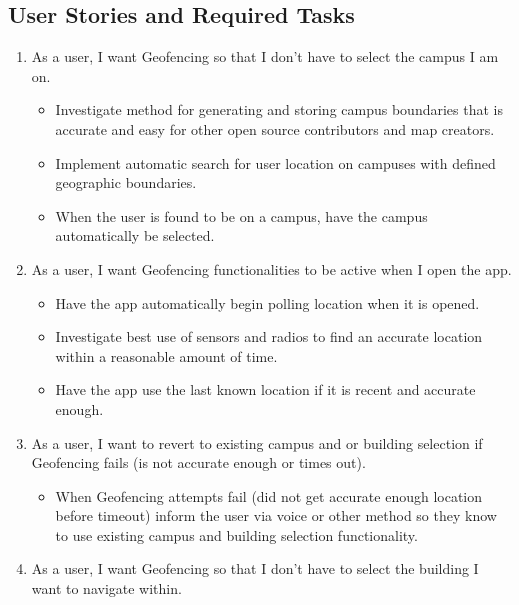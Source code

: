 \documentclass{scrreprt}
\begin{document}
\subsection{User Stories and Required Tasks}
\begin{enumerate}
	\item As a user, I want Geofencing so that I don't have to select the campus I am on.
	
		\begin{itemize}
			\item Investigate method for generating and storing campus boundaries that is accurate and easy for other open source contributors and map creators.
			\item Implement automatic search for user location on campuses with defined geographic boundaries.
			\item When the user is found to be on a campus, have the campus automatically be selected.
		\end{itemize}
		
	\item As a user, I want Geofencing functionalities to be active when I open the app.
	
		\begin{itemize}
			\item Have the app automatically begin polling location when it is opened.
			\item Investigate best use of sensors and radios to find an accurate location within a reasonable amount of time.
			\item Have the app use the last known location if it is recent and accurate enough.
		\end{itemize}
		
	\item As a user, I want to revert to existing campus and or building selection if Geofencing fails (is not accurate enough or times out).
	
		\begin{itemize}
			\item When Geofencing attempts fail (did not get accurate enough location before timeout) inform the user via voice or other method so they know to use existing campus and building selection functionality.
		\end{itemize}
		
	\item As a user, I want Geofencing so that I don't have to select the building I want to navigate within.
		\begin{itemize}
		

\end{itemize}
\end{enumerate}
\end{document}
